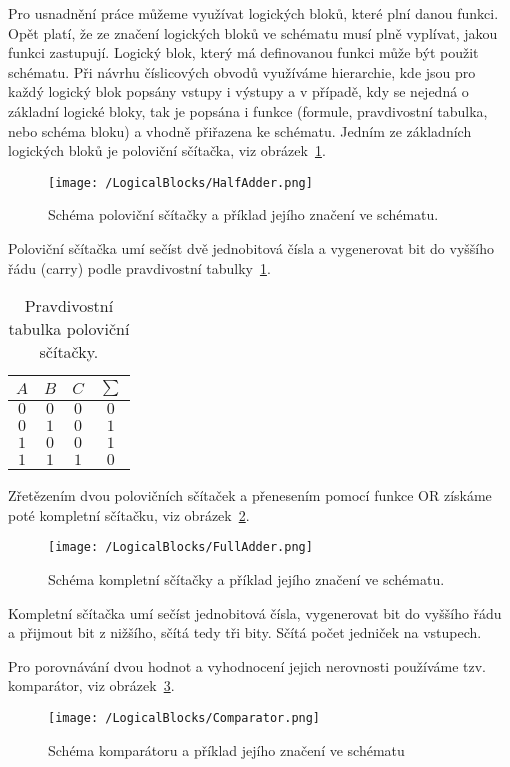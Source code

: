 \documentclass{report}
\begin{document}
Pro usnad\-nění práce můžeme využívat logických bloků, které plní danou funkci. Opět platí, že ze značení logických bloků ve schématu musí plně vyplívat, jakou funkci zastupují. Logický blok, který má definovanou funkci může být použit schématu. Při návrhu číslicových obvodů využíváme hierarchie, kde jsou pro každý logický blok popsány vstupy i výstupy a v případě, kdy se nejedná o základní logické bloky, tak je popsána i funkce (formule, pravdivostní tabulka, nebo schéma bloku) a vhodně přiřazena ke schématu. Jedním ze základních logických bloků je poloviční sčítačka, viz obrázek~\ref{fig:halfadder}.
\begin{figure}
\centering
\texttt{[image: /LogicalBlocks/HalfAdder.png]}
\caption{Schéma poloviční sčítačky a příklad jejího značení ve schématu.}
\label{fig:halfadder}
\end{figure}
 Poloviční sčítačka umí sečíst dvě jednobitová čísla a vygenerovat bit do vyššího řádu (carry) podle pravdivostní tabulky~\ref{tab:halfaddertab}.
\begin{table}
\centering
 \begin{tabular}{ |c c|c c| } 
   	\hline
	$A$ & $B$ & $C$ & $\sum$ \\
   	\hline
	$0$ & $0$ & $0$ & $0$ \\
	$0$ & $1$ & $0$ & $1$\\
	$1$ & $0$ & $0$ & $1$\\
	$1$ & $1$ & $1$ & $0$\\
   	\hline
\end{tabular}
	\caption{Pravdivostní tabulka poloviční sčítačky.}
	\label{tab:halfaddertab}
\end{table}
Zřetězením dvou polovičních sčítaček a přenesením pomocí funkce OR získáme poté kompletní sčítačku, viz obrázek~\ref{fig:fulladder}.\cite{kubatova}
\begin{figure}
\centering
\texttt{[image: /LogicalBlocks/FullAdder.png]}
\caption{Schéma kompletní sčítačky a příklad jejího značení ve schématu.}
\label{fig:fulladder}
\end{figure}
Kompletní sčítačka umí sečíst jednobitová čísla, vygenerovat bit do vyššího řádu a přijmout bit z nižšího, sčítá tedy tři bity. Sčítá počet jedniček na vstupech. \par
Pro porovnávání dvou hodnot a vyhodnocení jejich nerovnosti používáme tzv. komparátor, viz obrázek~\ref{fig:comparator}. 
\begin{figure}
\centering
\texttt{[image: /LogicalBlocks/Comparator.png]}
\caption{Schéma komparátoru a příklad jejího značení ve schématu}
\label{fig:comparator}
\end{figure}
\end{document}
